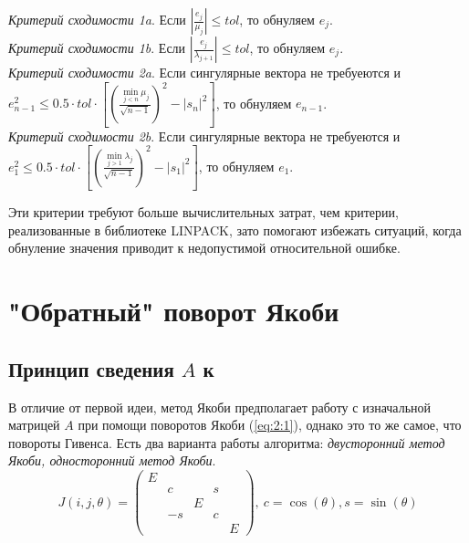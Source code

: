 \documentclass[12pt, a4paper]{report}
\theoremstyle{note}
\begin{document}
\noindent\textit{Критерий сходимости 1a}. Если $|\frac{e_j}{\mu_j}|\leq tol$, то обнуляем $e_j$.\vspace{1em}
\\\textit{Критерий сходимости 1b}. Если $|\frac{e_j}{\lambda_{j+1}}|\leq tol$, то обнуляем $e_j$.\vspace{1em}
\\\textit{Критерий сходимости 2a}. Если сингулярные вектора не требуеются и\linebreak $e^2_{n-1}\leq0.5\cdot tol\cdot [(\frac{\min\limits_{j<n}\mu_j}{\sqrt{n-1}})^2-|s_n|^2]$, то обнуляем $e_{n-1}$.\vspace{1em}
\\\textit{Критерий сходимости 2b}. Если сингулярные вектора не требуеются и\linebreak $e^2_1\leq0.5\cdot tol\cdot [(\frac{\min\limits_{j>1}\lambda_j}{\sqrt{n-1}})^2-|s_1|^2]$, то обнуляем $e_1$.\vspace{1em}

Эти критерии требуют больше вычислительных затрат, чем критерии, реализованные в библиотеке LINPACK, зато помогают избежать ситуаций, когда обнуление значения приводит к недопустимой относительной ошибке.


\section{"Обратный" поворот Якоби}

\subsection{Принцип сведения $A$ к \Sigma}
В отличие от первой идеи, метод Якоби предполагает работу с изначальной матрицей $A$ при помощи поворотов Якоби (\ref{eq:2:1}), однако это то же самое, что повороты Гивенса. Есть два варианта работы алгоритма:\textit{ двусторонний метод Якоби, односторонний метод Якоби}.
\begin{equation} \label{eq:2:1}
    J(i,j,\theta) = 
    \begin{pmatrix}E&&&&\\
        &c&&s\\
        &&E&&\\
        &-s&&c\\
        &&&&E
    \end{pmatrix},\
    c = \cos(\theta), s =\sin(\theta) 
\end{equation}
\end{document}
